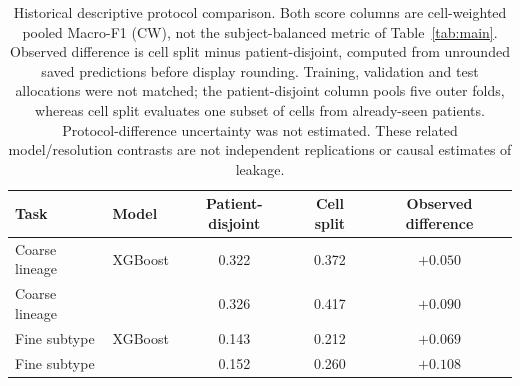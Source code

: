 \begin{table}[!htbp]
\centering
\small
\setlength{\tabcolsep}{4pt}
\renewcommand{\arraystretch}{1.10}
\begin{tabular}{llccc}
\toprule
\textbf{Task} & \textbf{Model} & \textbf{Patient-disjoint} & \textbf{Cell split} & \textbf{Observed difference} \\
\midrule
Coarse lineage & XGBoost & 0.322 & 0.372 & $+0.050$ \\
Coarse lineage & \ourmethod{} & 0.326 & 0.417 & $+0.090$ \\
Fine subtype & XGBoost & 0.143 & 0.212 & $+0.069$ \\
Fine subtype & \ourmethod{} & 0.152 & 0.260 & $+0.108$ \\
\bottomrule
\end{tabular}
\caption{Historical descriptive protocol comparison. Both score columns are
cell-weighted pooled Macro-F1 (CW), not the subject-balanced metric of
Table~\ref{tab:main}. Observed difference is cell split minus patient-disjoint,
computed from unrounded saved predictions before display rounding.
Training, validation and test allocations were not matched; the patient-disjoint
column pools five outer folds, whereas cell split evaluates one subset of cells
from already-seen patients. Protocol-difference uncertainty was not estimated.
These related model/resolution contrasts are not independent replications or
causal estimates of leakage.}
\label{tab:protocol_sensitivity}
\end{table}
